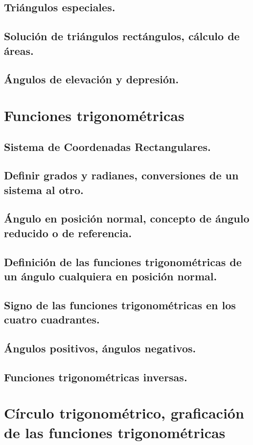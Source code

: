 \subsection{Triángulos especiales.}
\subsection{Solución de triángulos rectángulos, cálculo de áreas.}
\subsection{Ángulos de elevación y depresión. }


\section{Funciones trigonométricas} %
\subsection{Sistema de Coordenadas Rectangulares.}
\subsection{Definir grados y radianes, conversiones de un sistema al otro.}
\subsection{Ángulo en posición normal, concepto de ángulo reducido o de referencia.}
\subsection{Definición de las funciones trigonométricas de un ángulo cualquiera en posición normal.}
\subsection{Signo de las funciones trigonométricas en los cuatro cuadrantes.}
\subsection{Ángulos positivos, ángulos negativos.}
\subsection{Funciones trigonométricas inversas. }

\section{Círculo trigonométrico, graficación de las funciones trigonométricas} %
